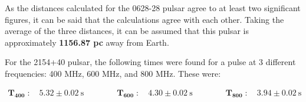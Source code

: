 \documentclass[12pt]{article}
\begin{document}
\begin{table}[H]
    \centering
    \caption{Distance to the 0628-28 pulsar through dispersion analysis using Eq. \ref{eq:3}.}
    \label{tab:3}
\end{table}

As the distances calculated for the 0628-28 pulsar agree to at least two significant figures, it can be said that the calculations agree with each other. Taking the average of the three distances, it can be assumed that this pulsar is approximately \textbf{1156.87 pc} away from Earth.

For the 2154+40 pulsar, the following times were found for a pulse at 3 different frequencies: 400 MHz, 600 MHz, and 800 MHz. These were:

\vspace{-2ex}
\begin{gather*}
    \mathbf{T_{400}} \; : \quad 5.32 \pm 0.02 \:\text{s} \qquad\qquad \mathbf{T_{600}} \; : \quad 4.30 \pm 0.02 \:\text{s} \qquad\qquad \mathbf{T_{800}} \; : \quad 3.94 \pm 0.02 \:\text{s}
\end{gather*}
\end{document}
